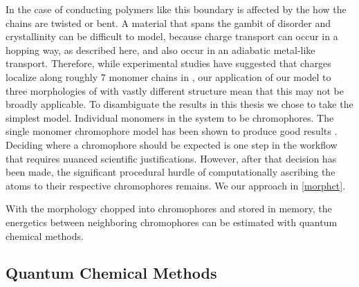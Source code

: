 In the case of conducting polymers like  this boundary is affected by the how the chains are twisted
or bent. A material that spans the gambit of disorder and crystallinity can be difficult to model, because
charge transport can occur in a hopping way, as described here, and also occur in an adiabatic metal-like transport. 
Therefore, while experimental studies have suggested that charges localize along roughly 7 monomer chains
in , our application of our model to three morphologies of  with vastly different structure mean 
that this may not be broadly applicable. To disambiguate the results in this thesis we chose to take the
simplest model. Individual monomers in the system to be chromophores. The single monomer chromophore model has been shown to
produce good results \cite{jones2017}.
Deciding where a chromophore should be expected is one step in the workflow that requires nuanced
scientific justifications. However, after that decision has been made, the significant procedural hurdle of 
computationally ascribing the atoms to their respective chromophores remains.
We our approach in \autoref{morphct}.

With the morphology chopped into chromophores and stored in memory, the energetics between
neighboring chromophores can be estimated with quantum chemical methods.

\subsection{Quantum Chemical Methods}
\label{qccmethods}

